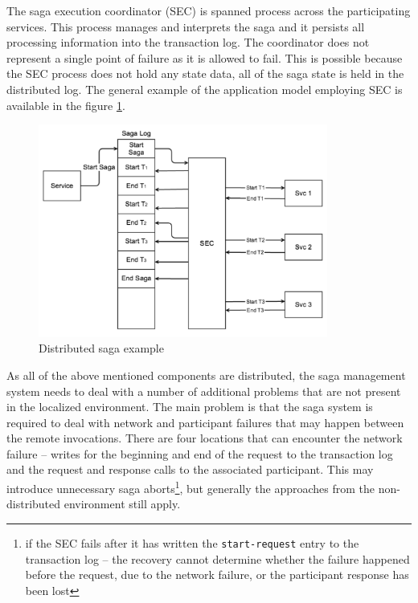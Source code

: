 \documentclass[oneside,
  digital, %
  table,   %
  nolof,     %
  nolot,     %
]{fithesis3}
\begin{document}
The saga execution coordinator (SEC) is spanned process across the participating services. This process manages and interprets the saga and it persists all processing information into the transaction log. The coordinator does not represent a single point of failure as it is allowed to fail. This is possible because the SEC process does not hold any state data, all of the saga state is held in the distributed log. The general example of the application model employing SEC is available in the figure \ref{fig:SEC}.

\begin{figure}
    \begin{center}
        \includegraphics[height=70mm]{images/SEC.png}
    \end{center}
    \caption{Distributed saga example \cite{applying_saga_pattern}}
    \label{fig:SEC}
\end{figure}

As all of the above mentioned components are distributed, the saga management system needs to deal with a number of additional problems that are not present in the localized environment. The main problem is that the saga system is required to deal with network and participant failures that may happen between the remote invocations. There are four locations that can encounter the network failure -- writes for the beginning and end of the request to the transaction log and the request and response calls to the associated participant. This may introduce unnecessary saga aborts\footnote{if the SEC fails after it has written the \texttt{start-request} entry to the transaction log -- the recovery cannot determine whether the failure happened before the request, due to the network failure, or the participant response has been lost}, but generally the approaches from the non-distributed environment still apply.
\end{document}
